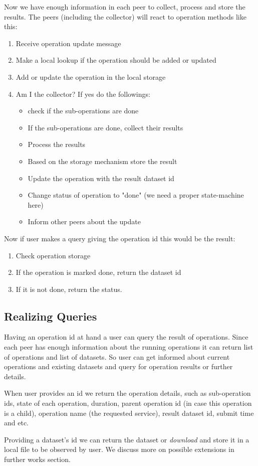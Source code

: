 Now we have enough information in each peer to collect, process and store the results. The peers (including the collector)
 will react to operation methods like this:

\begin{enumerate}
\item Receive operation update message
\item Make a local lookup if the operation should be added or updated
\item Add or update the operation in the local storage
\item Am I the collector? If yes do the followings:
\begin{itemize}
\item check if the sub-operations are done
\item If the sub-operations are done, collect their results
\item Process the results
\item Based on the storage mechanism store the result
\item Update the operation with the result dataset id
\item Change status of operation to "done" (we need a proper state-machine here)
\item Inform other peers about the update
\end{itemize}
\end{enumerate}

Now if user makes a query giving the operation id this would be the result:

\begin{enumerate}
\item Check operation storage
\item If the operation is marked done, return the dataset id
\item If it is not done, return the status.
\end{enumerate}

\subsection{Realizing Queries}
Having an operation id at hand a user can query the result of operations. 
Since each peer has enough information about the running operations it can return list of operations and list of datasets.
So user can get informed about current operations and existing datasets and query for operation results or further details.

When user provides an id we return the operation details, such as sub-operation ids, state of each operation,
duration, parent operation id (in case this operation is a child), operation name (the requested service), 
result dataset id, submit time and etc.

Providing a dataset's id we can return the dataset or \textit{download} and store it in a local file to be observed by user.
We discuss more on possible extensions in further works section.
